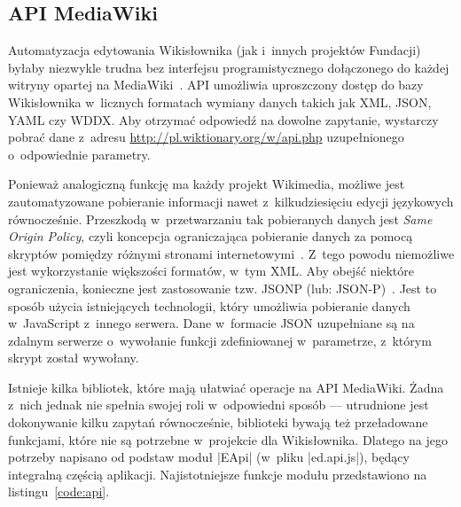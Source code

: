 \subsection{API MediaWiki}
Automatyzacja edytowania Wikisłownika (jak i~innych projektów Fundacji) byłaby niezwykle trudna bez interfejsu programistycznego dołączonego do każdej witryny opartej na MediaWiki~\cite{mw:api}. API umożliwia uproszczony dostęp do bazy Wikisłownika w~licznych formatach wymiany danych takich jak XML, JSON, YAML czy WDDX. Aby otrzymać odpowiedź na dowolne zapytanie, wystarczy pobrać dane z~adresu \url{http://pl.wiktionary.org/w/api.php} uzupełnionego o~odpowiednie parametry.

Ponieważ analogiczną funkcję ma każdy projekt Wikimedia, możliwe jest zautomatyzowane pobieranie informacji nawet z~kilkudziesięciu edycji językowych równocześnie. Przeszkodą w~przetwarzaniu tak pobieranych danych jest \emph{Same Origin Policy}, czyli koncepcja ograniczająca pobieranie danych za pomocą skryptów pomiędzy różnymi stronami internetowymi~\cite{mozilla:sop}. Z~tego powodu niemożliwe jest wykorzystanie większości formatów, w~tym XML. Aby obejść niektóre ograniczenia, konieczne jest zastosowanie tzw. JSONP (lub: \hbox{JSON-P})~\cite{jsonp}. Jest to sposób użycia istniejących technologii, który umożliwia pobieranie danych w~JavaScript z~innego serwera. Dane w~formacie JSON uzupełniane są na zdalnym serwerze o~wywołanie funkcji zdefiniowanej w~parametrze, z~którym skrypt został wywołany.

Istnieje kilka bibliotek, które mają ułatwiać operacje na API MediaWiki. Żadna z~nich jednak nie spełnia swojej roli w~odpowiedni sposób --- utrudnione jest dokonywanie kilku zapytań równocześnie, biblioteki bywają też przeładowane funkcjami, które nie są potrzebne w~projekcie dla Wikisłownika. Dlatego na jego potrzeby napisano od podstaw moduł \kod|EApi| (w~pliku \kod|ed.api.js|), będący integralną częścią aplikacji. Najistotniejsze funkcje modułu przedstawiono na listingu~\ref{code:api}.

